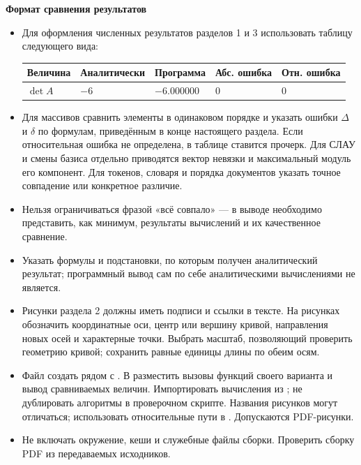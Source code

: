 \documentclass[12pt,a4paper]{article}
\newcommand{\taskhead}[1]{\par\textbf{#1}\par}
\begin{document}
\newpage

\taskhead{Формат сравнения результатов}

\begin{itemize}
\item Для оформления численных результатов разделов 1 и 3 использовать таблицу следующего вида:
\begin{center}
\begin{tabular}{|l|l|l|l|l|}\hline
Величина & Аналитически & Программа & Абс. ошибка & Отн. ошибка\\\hline
$\det A$ & $-6$ & $-6.000000$ & $0$ & $0$\\\hline
\end{tabular}
\end{center}

\item Для массивов сравнить элементы в одинаковом порядке и указать
ошибки $\Delta$ и $\delta$ по формулам, приведённым в конце настоящего раздела.
Если относительная ошибка не определена, в таблице ставится прочерк.
Для СЛАУ и смены базиса отдельно приводятся вектор невязки и максимальный модуль его компонент.
Для токенов, словаря и порядка документов указать точное совпадение
или конкретное различие. 

\item Нельзя ограничиваться фразой «всё совпало» --- в выводе необходимо представить, как минимум, результаты вычислений и их качественное сравнение. 

\item Указать формулы и подстановки, по которым
получен аналитический результат; программный вывод сам по себе аналитическими вычислениями не является.

\item Рисунки раздела 2 должны иметь подписи и ссылки в тексте. На рисунках обозначить
координатные оси, центр или вершину кривой, направления новых осей и характерные
точки. Выбрать масштаб, позволяющий проверить геометрию кривой;
сохранить равные единицы длины по обеим осям.

\item Файл  создать рядом с .
В  разместить вызовы функций своего варианта
и вывод сравниваемых величин. Импортировать вычисления из
; не дублировать алгоритмы в проверочном скрипте.
Названия рисунков могут отличаться; использовать относительные пути
в . Допускаются PDF-рисунки.

\item Не включать окружение, кеши и служебные файлы сборки. Проверить сборку PDF из передаваемых исходников.

\end{itemize}
\end{document}
